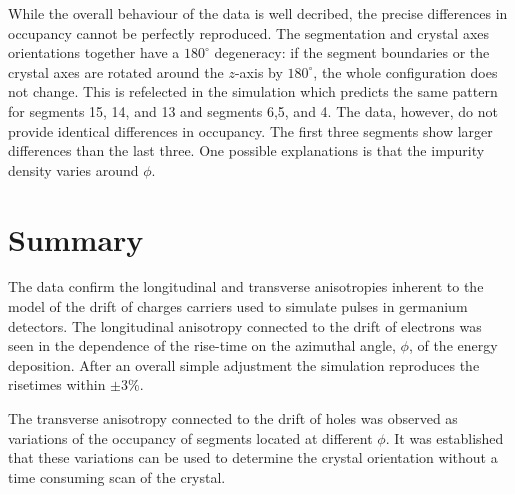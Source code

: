 While the overall behaviour of the data is well decribed, 
the precise differences in occupancy cannot be perfectly reproduced.
The segmentation and crystal axes orientations 
together have a $180^{\circ}$ degeneracy: if the segment 
boundaries or the crystal axes are rotated 
around the $z$-axis by $180^{\circ}$, 
the whole configuration does not change. 
This is refelected in the simulation which predicts the same pattern 
for segments 15, 14, and 13 and segments 6,5, and 4. 
The data, however, do not provide identical differences in occupancy. 
The first three segments show larger differences than the last three. 
One possible explanations is that the impurity density varies around $\phi$.


\section{Summary}
\label{sec:psa:sum}

The data confirm 
the longitudinal and transverse anisotropies inherent to 
the model of the drift of charges carriers used to simulate pulses 
in germanium detectors. 
The longitudinal anisotropy connected to the drift of electrons 
was seen in the dependence of the rise-time on the azimuthal angle, 
$\phi$, of the energy deposition. 
After an overall simple adjustment the simulation 
reproduces the risetimes within $\pm$3\%.

The transverse anisotropy connected to the drift of holes was observed 
as variations of the occupancy of segments 
located at different $\phi$. It was established 
that these variations can be used to 
determine the crystal orientation without a time 
consuming scan of the crystal.

